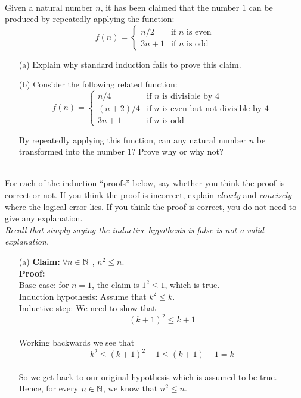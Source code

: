 \documentclass[11pt]{article}
\newif\ifsolutions
\begin{document}
\begin{qunlist}
 \\ 
Given a natural number $n$, it has been claimed that the number $1$ can be produced 
by repeatedly applying the function:
\[ f(n) = \left\{ \begin{array}{cl} n/2 & \text{if $n$ is even} \\
3n + 1 & \text{if $n$ is odd} \end{array} \right. \]

\begin{itemize}
\item[(a)] Explain why standard induction fails to prove this claim.
\item[(b)] Consider the following related function:
\[ f(n) = \left\{ \begin{array}{cl} n/4 & \text{if $n$ is divisible by 4} \\
(n+2)/4 & \text{if $n$ is even but not divisible by 4} \\
3n + 1 & \text{if $n$ is odd} \end{array} \right. \]

By repeatedly applying this function, can any natural number $n$ be transformed into the number $1$?  
Prove why or why not?
\end{itemize}

\ifsolutions
\textbf{Solutions:}
\fi



 \\
For each of the induction ``proofs'' below, say whether you think the proof is correct or not.
If you think the proof is incorrect, explain \textit{clearly} and \textit{concisely} where the logical error lies.
If you think the proof is correct, you do not need to give any explanation. \\
\textit{Recall that simply saying the inductive hypothesis is false is not a valid explanation.}

\begin{itemize}
\item[(a)] \textbf{Claim:} $\forall n \in \mathbb{N}$ , $n^2 \leq n$. \\
\textbf{Proof:} \\
Base case: for $n = 1$, the claim is $1^2 \leq 1$, which is true. \\
Induction hypothesis: Assume that $k^2 \leq k$. \\
Inductive step: We need to show that \[ (k+1)^2 \leq k+1\] \\
Working backwards we see that \[ k^2 \leq (k+1)^2 - 1 \leq (k+1) - 1 = k \] \\
So we get back to our original hypothesis which is assumed to be true.\\
Hence, for every $n \in \mathbb{N}$, we know that $n^2 \leq n$. 


\end{itemize}
\end{qunlist}
\end{document}
